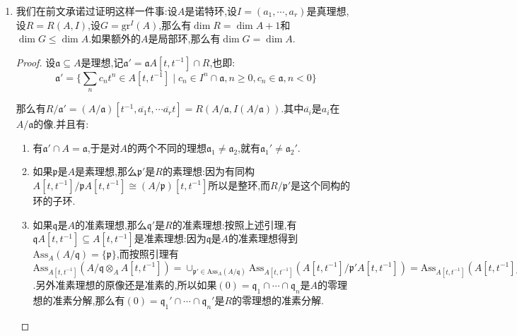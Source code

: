 \begin{enumerate}
\begin{proof}
    	这里商是$(M_i\otimes_RN)/(M_{i-1}\otimes_RN)\cong N/\mathfrak{p}_iN$.这就导致$\mathfrak{q}\in\mathrm{Ass}_S(M\otimes_RN)\subsetneqq\cup_{i=1}^r\mathrm{Ass}_S(N/\mathfrak{p}_iN)$.取$\mathfrak{q}\in\mathrm{Ass}_S(M\otimes_RN)$,设$\mathfrak{q}\in\mathrm{Ass}_S(N/\mathfrak{p}_iN)$,记$\mathfrak{p}=R\cap\mathfrak{q}$,那么我们前面证明了$\mathfrak{p}\in\mathrm{Ass}_R(R/\mathfrak{p}_i)$,迫使$\mathfrak{p}=\mathfrak{p}_i$,于是我们证明了另一侧的包含关系:
    	$$\mathrm{Ass}_S(M\otimes_RN)\subseteq\cup_{\mathfrak{p}\in\mathrm{Ass}_R(M)}\mathrm{Ass}_S(N/\mathfrak{p}N)$$
    	
    \end{proof}
    \item 我们在前文承诺过证明这样一件事:设$A$是诺特环,设$I=(a_1,\cdots,a_r)$是真理想,设$R=R(A,I)$,设$G=\mathrm{gr}^I(A)$,那么有$\dim R=\dim A+1$和$\dim G\le\dim A$.如果额外的$A$是局部环,那么有$\dim G=\dim A$.
    \begin{proof}
    	
    	设$\mathfrak{a}\subseteq A$是理想,记$\mathfrak{a}'=\mathfrak{a}A[t,t^{-1}]\cap R$,也即:
    	$$\mathfrak{a}'=\{\sum_nc_nt^n\in A[t,t^{-1}]\mid c_n\in I^n\cap\mathfrak{a},n\ge0,c_n\in\mathfrak{a},n<0\}$$
    	
    	那么有$R/\mathfrak{a}'=(A/\mathfrak{a})[t^{-1},\overline{a_1}t,\cdots\overline{a_r}t]=R(A/\mathfrak{a},I(A/\mathfrak{a}))$.其中$\overline{a_i}$是$a_i$在$A/\mathfrak{a}$的像.并且有:
    	\begin{enumerate}
    		\item 有$\mathfrak{a}'\cap A=\mathfrak{a}$,于是对$A$的两个不同的理想$\mathfrak{a}_1\not=\mathfrak{a}_2$,就有$\mathfrak{a}_1'\not=\mathfrak{a}_2'$.
    		\item 如果$\mathfrak{p}$是$A$是素理想,那么$\mathfrak{p}'$是$R$的素理想:因为有同构$A[t,t^{-1}]/\mathfrak{p}A[t,t^{-1}]\cong(A/\mathfrak{p})[t,t^{-1}]$所以是整环,而$R/\mathfrak{p}'$是这个同构的环的子环.
    		\item 如果$\mathfrak{q}$是$A$的准素理想,那么$\mathfrak{q}'$是$R$的准素理想:按照上述引理,有$\mathfrak{q}A[t,t^{-1}]\subseteq A[t,t^{-1}]$是准素理想:因为$\mathfrak{q}$是$A$的准素理想得到$\mathrm{Ass}_A(A/\mathfrak{q})=\{\mathfrak{p}\}$,而按照引理有$\mathrm{Ass}_{A[t,t^{-1}]}(A/\mathfrak{q}\otimes_AA[t,t^{-1}])=\cup_{\mathfrak{p}'\in\mathrm{Ass}_A(A/\mathfrak{q})}\mathrm{Ass}_{A[t,t^{-1}]}(A[t,t^{-1}]/\mathfrak{p}'A[t,t^{-1}])=\mathrm{Ass}_{A[t,t^{-1}]}(A[t,t^{-1}]/\mathfrak{p}A[t,t^{-1}])=\{\mathfrak{p}A[t,t^{-1}]\}$.另外准素理想的原像还是准素的,所以如果$(0)=\mathfrak{q}_1\cap\cdots\cap\mathfrak{q}_n$是$A$的零理想的准素分解,那么有$(0)=\mathfrak{q}_1'\cap\cdots\cap\mathfrak{q}_n'$是$R$的零理想的准素分解.
    	\end{enumerate}
    

\end{proof}
\end{enumerate}
